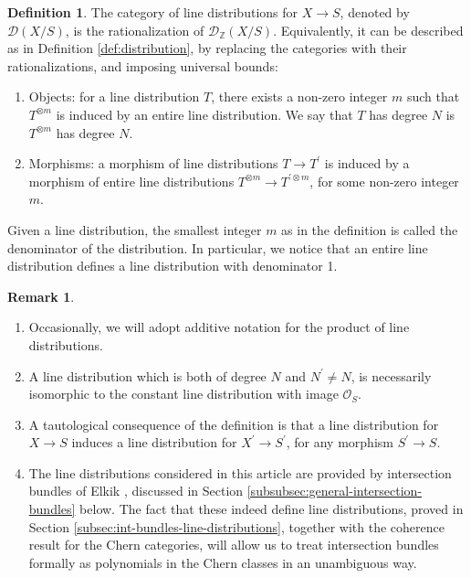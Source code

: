 \documentclass[11pt]{article}
\newcommand{\skpt}{\smallskip}
\theoremstyle{plain}
\theoremstyle{definition}
\newtheorem{definition}[theorem]{Definition}
\newtheorem{remark}[theorem]{Remark}
\newcommand{\ZBbb}{\mathbb Z}
\newcommand{\Dcal}{\mathcal D}
\newcommand{\Ocal}{\mathcal O}
\begin{document}
\begin{definition}\label{def:Q-distribution}
The category of line distributions for $X\to S$, denoted by $\Dcal(X/S)$, is the rationalization of $\Dcal_{\ZBbb}(X/S)$. Equivalently, it can be described as in Definition \ref{def:distribution}, by replacing the categories with their rationalizations, and imposing universal bounds:
\begin{enumerate}
\item Objects: for a line distribution $T$, there exists a non-zero integer $m$ such that $T^{\otimes m}$ is induced by an entire line distribution. We say that $T$ has degree $N$ is $T^{\otimes m}$ has degree $N$.
\item Morphisms: a morphism of line distributions $T\to T^{\prime}$ is induced by a morphism of entire line distributions $T^{\otimes m}\to T^{\prime\otimes m} $, for some non-zero integer $m$.
\end{enumerate}
\end{definition}
Given a line distribution, the smallest integer $m$ as in the definition is called the denominator of the distribution. In particular, we notice that an entire line distribution defines a line distribution with denominator 1.\enlargethispage{.5\baselineskip}%

\skpt
\begin{remark}
\begin{enumerate}
\item Occasionally, we will adopt additive notation for the product of line distributions.
\item A line distribution which is both of degree $N$ and $N^{\prime}\neq N$, is necessarily isomorphic to the constant line distribution with image $\Ocal_{S}$.
\item A tautological consequence of the definition is that a line distribution for \hbox{$X\!\to\! S$} induces a line distribution for $X^{\prime}\to S^{\prime}$, for any morphism $S^{\prime}\to S$.
\item The line distributions considered in this article are provided by intersection bundles of Elkik \cite{Elkikfib}, discussed in Section \ref{subsubsec:general-intersection-bundles} below. The fact that these indeed define line distributions, proved in Section \ref{subsec:int-bundles-line-distributions}, together with the coherence result for the Chern categories, will allow us to treat intersection bundles formally as polynomials in the Chern classes in an unambiguous way.
\end{enumerate}
\end{remark}
\end{document}
